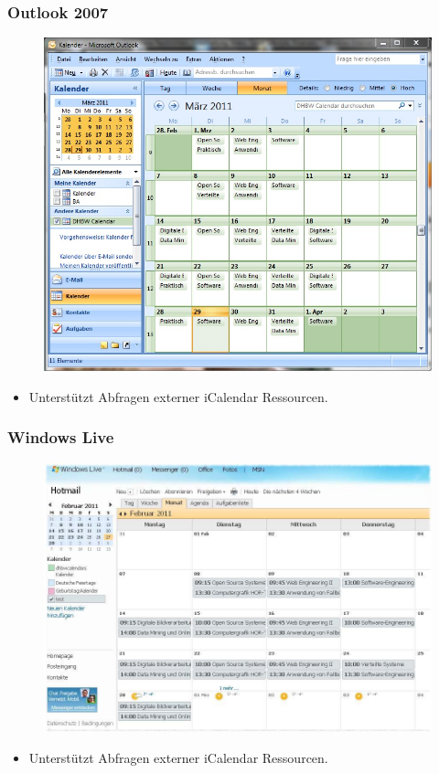 \documentclass{beamer}
\begin{document}
\begin{frame}\frametitle{Outlook 2007}
  \begin{figure}
    \centering
    \includegraphics[height=0.6\paperheight]{images/dhbwcalendar-outlook2007.jpg}
  \end{figure}
  \begin{itemize}
    \item Unterstützt Abfragen externer iCalendar Ressourcen.
  \end{itemize}
\end{frame}

\begin{frame}\frametitle{Windows Live}
  \begin{figure}
    \centering
    \includegraphics[height=0.6\paperheight]{images/dhbwcalendar-live-web.jpg}
  \end{figure}
  \begin{itemize}
    \item Unterstützt Abfragen externer iCalendar Ressourcen.
  \end{itemize}
\end{frame}
\end{document}

